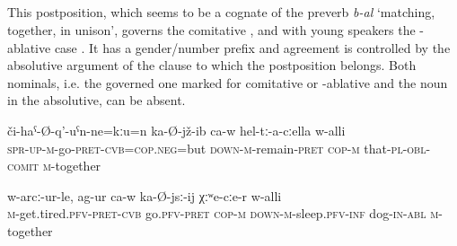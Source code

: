 
\subsection{ }
\label{ssec:postposition balli}

This postposition, which seems to be a cognate of the preverb \textit{b-al} `matching, together, in unison', governs the comitative , and with young speakers the -ablative case . It has a gender/number prefix and agreement is controlled by the absolutive argument of the clause to which the postposition belongs. Both nominals, i.e. the governed one marked for comitative or -ablative and the noun in the absolutive, can be absent.
%
\begin{exe}
	\ex
	\begin{xlist}
		\ex	\label{He is sitting together with them}
		\gll	či-haˁ-Ø-q'-uˁn-ne=kːu=n	ka-Ø-jž-ib	ca-w	hel-tː-a-cːella	w-alli  \\
			\textsc{spr-up}-\textsc{m}-go-\textsc{pret}-\textsc{cvb}=\textsc{cop.neg}=but	\textsc{down-m}-remain-\textsc{pret}	\textsc{cop-m}	that-\textsc{pl}-\textsc{obl}-\textsc{comit}	\textsc{m}-together\\
		\glt	{}

		\ex	\label{He went to sleep together with the dog}
		\gll	w-arcː-ur-le,	ag-ur	ca-w	ka-Ø-jsː-ij	χːʷe-cːe-r	w-alli  \\
			\textsc{m}-get.tired.\textsc{pfv}-\textsc{pret}-\textsc{cvb}	go.\textsc{pfv}-\textsc{pret}	\textsc{cop}-\textsc{m} \textsc{down-m}-sleep.\textsc{pfv}-\textsc{inf}	dog-\textsc{in}-\textsc{abl}	\textsc{m}-together\\
		\glt	{}
	\end{xlist}
\end{exe}

